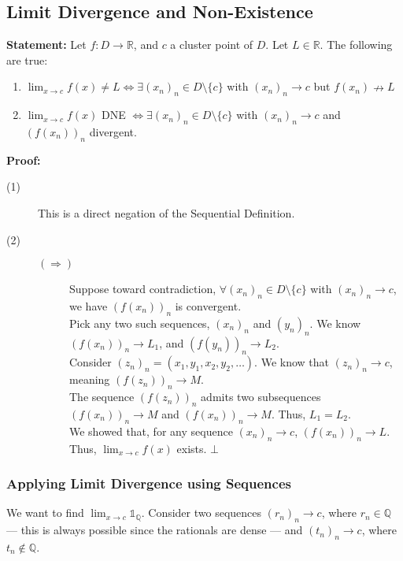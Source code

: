 \documentclass[10pt]{extarticle}
\newcommand{\Q}{\mathbb{Q}}
\newcommand{\R}{\mathbb{R}}
\begin{document}
  \subsection{Limit Divergence and Non-Existence}%
    \textbf{Statement:} Let $f: D\rightarrow \R$, and $c$ a cluster point of $D$. Let $L \in\R$. The following are true:
    \begin{enumerate}[(1)]
      \item $\lim_{x\rightarrow c}f(x) \neq L \Leftrightarrow \exists (x_n)_n \in D\setminus \{c\}$ with $(x_n)_n\rightarrow c$ but $f(x_n)\nrightarrow L$
      \item $\lim_{x\rightarrow c} f(x)$ DNE $\Leftrightarrow \exists (x_n)_n\in D\setminus\{c\}$ with $(x_n)_n \rightarrow c$ and $\left(f(x_n)\right)_n$ divergent.
    \end{enumerate}
    \textbf{Proof:}
    \begin{description}
      \item[(1)] This is a direct negation of the Sequential Definition.
      \item[(2)]\hfill
        \begin{description}
          \item[$(\Rightarrow)$] Suppose toward contradiction, $\forall (x_n)_n\in D\setminus \{c\}$ with $(x_n)_n \rightarrow c$, we have $\left(f(x_n)\right)_n$ is convergent.\\

            Pick any two such sequences, $(x_n)_n$ and $(y_n)_n$. We know $\left(f(x_n)\right)_n \rightarrow L_1$, and $\left(f(y_n)\right)_n \rightarrow L_2$.\\

            Consider $(z_n)_n = (x_1,y_1,x_2,y_2,\dots)$. We know that $(z_n)_n \rightarrow c$, meaning $\left(f(z_n)\right)_n \rightarrow M$.\\

            The sequence $\left(f(z_n)\right)_n$ admits two subsequences $\left(f(x_n)\right)_n \rightarrow M$ and $\left(f(x_n)\right)_n \rightarrow M$. Thus, $L_1 = L_2$.\\

            We showed that, for any sequence $\left(x_n\right)_n \rightarrow c$, $\left(f(x_n)\right)_n \rightarrow L$. Thus, $\lim_{x\rightarrow c}f(x)$ exists. $\bot$\\
        \end{description}
    \end{description}
    \subsubsection{Applying Limit Divergence using Sequences}%
    We want to find $\lim_{x\rightarrow c}\mathbb{1}_{\Q}$. Consider two sequences $(r_n)_n \rightarrow c$, where $r_n \in \Q$ --- this is always possible since the rationals are dense --- and $(t_n)_n \rightarrow c$, where $t_n \notin \Q$.\\
\end{document}
